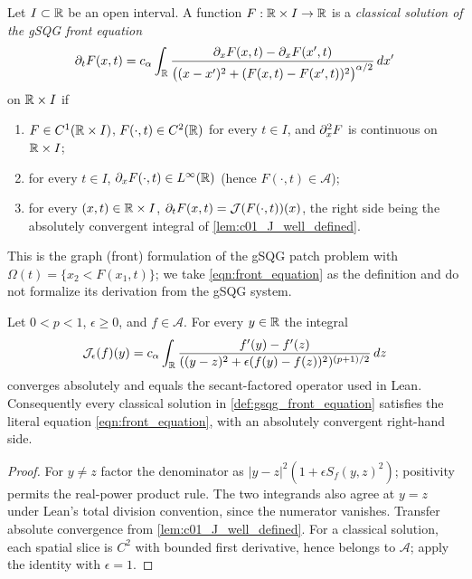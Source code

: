 \begin{definition}
  \label{def:gsqg_front_equation}
  Let $I\subset\mathbb{R}$ be an open interval.  A function $F:\mathbb{R}\times I\to\mathbb{R}$ is a
  \emph{classical solution of the gSQG front equation}
  \begin{equation}\label{eqn:front_equation}
    \partial_tF(x,t)=c_\alpha\int_{\mathbb{R}}\frac{\partial_xF(x,t)-\partial_xF(x',t)}
    {\bigl((x-x')^2+(F(x,t)-F(x',t))^2\bigr)^{\alpha/2}}\,dx'
  \end{equation}
  on $\mathbb{R}\times I$ if
  \begin{enumerate}
    \item $F\in C^1(\mathbb{R}\times I)$, $F(\cdot,t)\in C^2(\mathbb{R})$ for every $t\in I$, and $\partial_x^2F$ is
      continuous on $\mathbb{R}\times I$;
    \item for every $t\in I$, $\partial_xF(\cdot,t)\in L^\infty(\mathbb{R})$ (hence $F(\cdot,t)\in\mathcal A$);
    \item for every $(x,t)\in\mathbb{R}\times I$, $\partial_tF(x,t)=\mathcal{J}(F(\cdot,t))(x)$, the right side being
      the absolutely convergent integral of \cref{lem:c01_J_well_defined}.
  \end{enumerate}
  This is the graph (front) formulation of the gSQG patch problem with
  $\Omega(t)=\{x_2<F(x_1,t)\}$; we take \eqref{eqn:front_equation} as the definition and do not
  formalize its derivation from the gSQG system.
\end{definition}

\begin{lemma}
  \label{lem:c01_paper_front_equation}
  Let $0<p<1$, $\epsilon\ge0$, and $f\in\mathcal A$. For every $y\in\mathbb{R}$ the integral
  \[
    \mathcal{J}_\epsilon(f)(y)=c_\alpha\int_{\mathbb{R}}
      \frac{f'(y)-f'(z)}{((y-z)^2+\epsilon(f(y)-f(z))^2)^{(p+1)/2}}\,dz
  \]
  converges absolutely and equals the secant-factored operator used in Lean.
  Consequently every classical solution in \cref{def:gsqg_front_equation} satisfies the
  literal equation \eqref{eqn:front_equation}, with an absolutely convergent right-hand side.
\end{lemma}
\begin{proof}
  For $y\ne z$ factor the denominator as
  $|y-z|^2(1+\epsilon S_f(y,z)^2)$; positivity permits the real-power product rule.
  The two integrands also agree at $y=z$ under Lean's total division convention, since the
  numerator vanishes. Transfer absolute convergence from \cref{lem:c01_J_well_defined}.
  For a classical solution, each spatial slice is $C^2$ with bounded first derivative,
  hence belongs to $\mathcal A$; apply the identity with $\epsilon=1$.
\end{proof}

